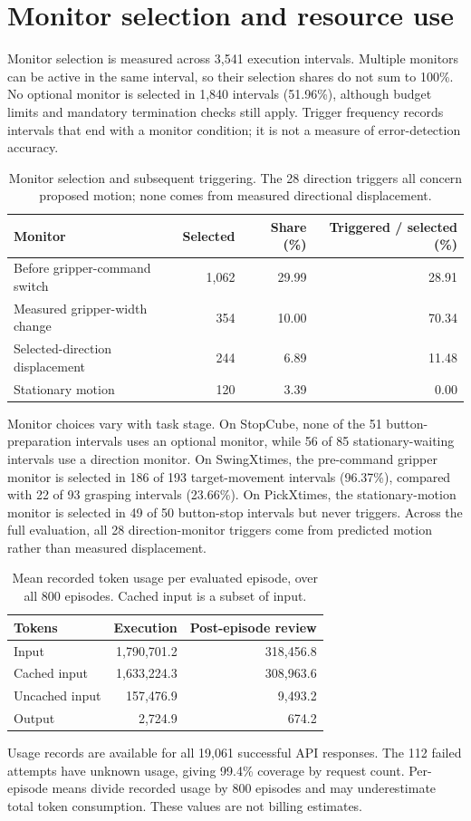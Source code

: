 \FloatBarrier
\section{Monitor selection and resource use}
Monitor selection is measured across 3,541 execution intervals. Multiple monitors can be active in the same interval, so their selection shares do not sum to 100\%. No optional monitor is selected in 1,840 intervals (51.96\%), although budget limits and mandatory termination checks still apply. Trigger frequency records intervals that end with a monitor condition; it is not a measure of error-detection accuracy.
\begin{table}[!htbp]
\centering\small
\caption{Monitor selection and subsequent triggering. The 28 direction triggers all concern proposed motion; none comes from measured directional displacement.}
\begin{tabularx}{\linewidth}{@{}Xrrr@{}}
\toprule
Monitor & Selected & Share (\%) & Triggered / selected (\%) \\
\midrule
Before gripper-command switch & 1,062 & 29.99 & 28.91 \\
Measured gripper-width change & 354 & 10.00 & 70.34 \\
Selected-direction displacement & 244 & 6.89 & 11.48 \\
Stationary motion & 120 & 3.39 & 0.00 \\
\bottomrule
\end{tabularx}
\end{table}

Monitor choices vary with task stage. On StopCube, none of the 51 button-preparation intervals uses an optional monitor, while 56 of 85 stationary-waiting intervals use a direction monitor. On SwingXtimes, the pre-command gripper monitor is selected in 186 of 193 target-movement intervals (96.37\%), compared with 22 of 93 grasping intervals (23.66\%). On PickXtimes, the stationary-motion monitor is selected in 49 of 50 button-stop intervals but never triggers. Across the full evaluation, all 28 direction-monitor triggers come from predicted motion rather than measured displacement.

\begin{table}[!htbp]
\centering\small
\caption{Mean recorded token usage per evaluated episode, over all 800 episodes. Cached input is a subset of input.}
\begin{tabular}{@{}lrr@{}}
\toprule
Tokens & Execution & Post-episode review \\
\midrule
Input & 1,790,701.2 & 318,456.8 \\
Cached input & 1,633,224.3 & 308,963.6 \\
Uncached input & 157,476.9 & 9,493.2 \\
Output & 2,724.9 & 674.2 \\
\bottomrule
\end{tabular}
\end{table}
Usage records are available for all 19,061 successful API responses. The 112 failed attempts have unknown usage, giving 99.4\% coverage by request count. Per-episode means divide recorded usage by 800 episodes and may underestimate total token consumption. These values are not billing estimates.

